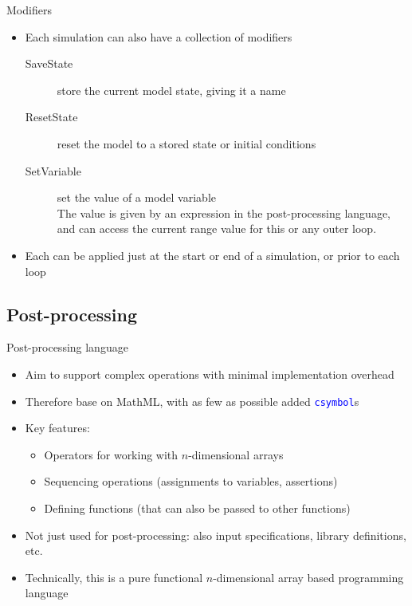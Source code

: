 \documentclass[t,xcolor={usenames,dvipsnames}]{beamer}
\newcommand{\csym}[1]{\textcolor{Blue}{\texttt{#1}}}
\begin{document}
\begin{frame}{Modifiers}
\begin{itemize}
\item Each simulation can also have a collection of \alert{modifiers}
  \begin{description}
  \item[SaveState] store the current model state, giving it a name
  \item[ResetState] reset the model to a stored state or initial conditions
  \item[SetVariable] set the value of a model variable\\
      The value is given by an expression in the post-processing language,
      and can access the current range value for this or any outer loop.
  \end{description}
\item Each can be applied just at the start or end of a simulation, or prior to each loop
\end{itemize}
\end{frame}

\subsection{Post-processing}


\begin{frame}{Post-processing language}
\begin{itemize}
\item Aim to support complex operations with minimal implementation overhead
\item Therefore base on MathML, with as few as possible added \csym{csymbol}s
\item Key features:
  \begin{itemize}
  \item Operators for working with $n$-dimensional arrays
  \item Sequencing operations (assignments to variables, assertions)
  \item Defining functions (that can also be passed to other functions)
  \end{itemize}
\item Not just used for post-processing: also input specifications, library definitions, etc.
\item Technically, this is a pure functional $n$-dimensional array based programming language
\end{itemize}
\end{frame}
\end{document}
